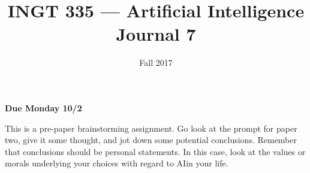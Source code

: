 \documentclass[nobib]{tufte-handout}
\title{INGT 335 --- Artificial Intelligence \\ Journal 7}
\author{}
\date{ Fall 2017 }
\begin{document}
\maketitle

\begin{center}
  \textbf{Due Monday 10/2}
\end{center}

This is a pre-paper brainstorming assignment.  Go look at the prompt for paper two, give it some thought, and jot down some potential conclusions. Remember that conclusions should be personal statements. In this case, look at the values or morals underlying your choices with regard to AI\@ in your life.
\end{document}
